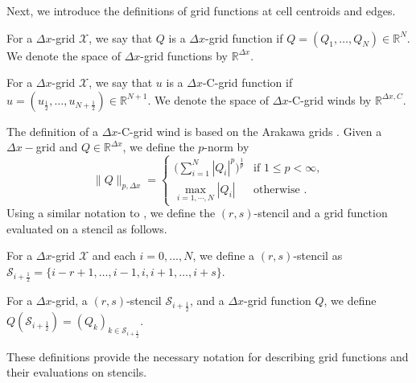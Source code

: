 Next, we introduce the definitions of grid functions at cell centroids and edges.
\begin{definition}
	For a $\Delta x$-grid $\mathcal{X}$, we say that $Q$ is a $\Delta x$-grid function if $Q = (Q_1, \ldots, Q_N) \in \mathbb{R}^N$.
	We denote the space of $\Delta x$-grid functions by $\mathbb{R}^{\Delta x}$.
\end{definition}
\begin{definition}
	For a $\Delta x$-grid $\mathcal{X}$, we say that $u$ is a $\Delta x$-C-grid function if
	$u = (u_{\frac{1}{2}}, \ldots, u_{N+\frac{1}{2}}) \in \mathbb{R}^{N+1}$.
	We denote the space of $\Delta x$-C-grid winds by $\mathbb{R}^{\Delta x, C}$.
\end{definition}
The definition of a $\Delta x$-C-grid wind is based on the Arakawa grids \citep{arakawa:1977}.
Given a $\Delta x-$grid and $Q \in \mathbb{R}^{\Delta x}$, we define the $p$-norm by
\begin{equation}
	\label{chp2-sec-not1}
	\|Q\|_{p,\Delta x}=
	\begin{cases}
		\bigg( \sum_{i=1}^{N} |Q_i|^p \bigg)^{\frac{1}{p}} & \text{if } 1\leq p < \infty,\\
		\max_{i=1, \cdots, N}{|Q_i|} & \text{otherwise }.
	\end{cases}
\end{equation}
Using a similar notation to \citet{engwirda:2016}, we define the $(r, s)$-stencil and a grid function evaluated on a stencil as follows.
\begin{definition}[$(r, s)$-stencil]
	For a $\Delta x$-grid $\mathcal{X}$ and each $i = 0, \ldots, N$, we define a $(r, s)$-stencil as
	$\mathcal{S}_{i+\frac{1}{2}} = \{i-r+1, \ldots, i-1, i, i+1, \ldots, i+s\}$.
\end{definition}
\begin{definition}
	For a $\Delta x$-grid, a $(r, s)$-stencil $\mathcal{S}_{i+\frac{1}{2}}$,
	 and a $\Delta x$-grid function $Q$, we define $Q(\mathcal{S}_{i+\frac{1}{2}}) = (Q_k)_{k \in \mathcal{S}_{i+\frac{1}{2}}}$.
\end{definition}
These definitions provide the necessary notation for describing grid functions and their evaluations on stencils.

